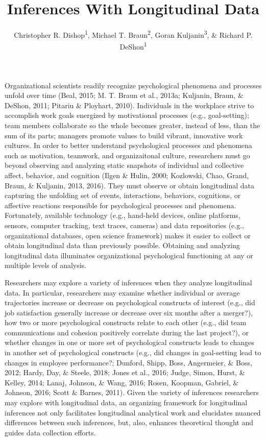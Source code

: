 \documentclass[english,,man]{apa6}
\title{Inferences With Longitudinal Data}
\author{Christopher R. Dishop\textsuperscript{1}, Michael T. Braun\textsuperscript{2}, Goran Kuljanin\textsuperscript{3}, \& Richard P. DeShon\textsuperscript{1}}
\date{}
\affiliation{
\vspace{0.5cm}
\textsuperscript{1} Michigan State University\\\textsuperscript{2} University of South Florida\\\textsuperscript{3} DePaul University}
\begin{document}
\maketitle

Organizational scientists readily recognize psychological phenomena and processes unfold over time (Beal, 2015; M. T. Braun et al., 2013a; Kuljanin, Braun, \& DeShon, 2011; Pitariu \& Ployhart, 2010). Individuals in the workplace strive to accomplish work goals energized by motivational processes (e.g., goal-setting); team members collaborate so the whole becomes greater, instead of less, than the sum of its parts; managers promote values to build vibrant, innovative work cultures. In order to better understand psychological processes and phenomena such as motivation, teamwork, and organizaitonal culture, researchers must go beyond observing and analyzing static snapshots of individual and collective affect, behavior, and cognition (Ilgen \& Hulin, 2000; Kozlowski, Chao, Grand, Braun, \& Kuljanin, 2013, 2016). They must observe or obtain longitudinal data capturing the unfolding set of events, interactions, behaviors, cognitions, or affective reactions responsible for psychological processes and phenomena. Fortunately, available technology (e.g., hand-held devices, online platforms, sensors, computer tracking, text traces, cameras) and data repositories (e.g., organizational databases, open science framework) makes it easier to collect or obtain longitudinal data than previously possible. Obtaining and analyzing longitudinal data illuminates organizational psychological functioning at any or multiple levels of analysis.

Researchers may explore a variety of inferences when they analyze longitudinal data. In particular, researchers may examine whether individual or average trajectories increase or decrease on psychological constructs of interest (e.g., did job satisfaction generally increase or decrease over six months after a merger?), how two or more psychological constructs relate to each other (e.g., did team communications and cohesion positively correlate during the last project?), or whether changes in one or more set of psychological constructs leads to changes in another set of psychological constructs (e.g., did changes in goal-setting lead to changes in employee performance?; Dunford, Shipp, Boss, Angermeier, \& Boss, 2012; Hardy, Day, \& Steele, 2018; Jones et al., 2016; Judge, Simon, Hurst, \& Kelley, 2014; Lanaj, Johnson, \& Wang, 2016; Rosen, Koopman, Gabriel, \& Johnson, 2016; Scott \& Barnes, 2011). Given the variety of inferences researchers may explore with longitudinal data, an organizing framework for longitudinal inferences not only facilitates longitudinal analytical work and elucidates nuanced differences between such inferences, but, also, enhances theoretical thought and guides data collection efforts.
\end{document}
